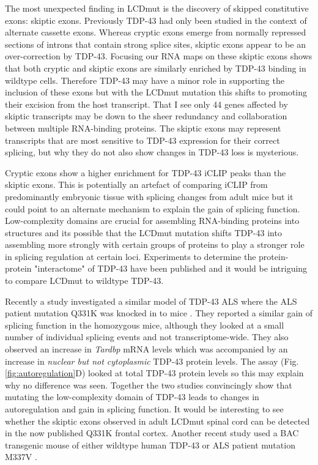 The most unexpected finding in LCDmut is the discovery of skipped constitutive exons: skiptic exons. 
Previously TDP-43 had only been studied in the context of alternate cassette exons.
Whereas cryptic exons emerge from normally repressed sections of introns that contain strong splice sites, skiptic exons appear to be an over-correction by TDP-43.
Focusing our RNA maps on these skiptic exons shows that both cryptic and skiptic exons are similarly enriched by TDP-43 binding in wildtype cells.
Therefore TDP-43 may have a minor role in supporting the inclusion of these exons but with the LCDmut mutation this shifts to promoting their excision from the host transcript.
That I see only 44 genes affected by skiptic transcripts may be down to the sheer redundancy and collaboration between multiple RNA-binding proteins. 
The skiptic exons may represent transcripts that are most sensitive to TDP-43 expression for their correct splicing, but why they do not also show changes in TDP-43 loss is mysterious.

Cryptic exons show a higher enrichment for TDP-43 iCLIP peaks than the skiptic exons. 
This is potentially an artefact of comparing iCLIP from predominantly embryonic tissue with splicing changes from adult mice but it could point to an alternate mechanism to explain the gain of splicing function.
Low-complexity domains are crucial for assembling RNA-binding proteins into structures  \cite{Gueroussov2017} and its possible that the LCDmut mutation shifts TDP-43 into assembling more strongly with certain groups of proteins to play a stronger role in splicing regulation at certain loci. 
Experiments to determine the protein-protein "interactome" of TDP-43 have been published \citep{Freibaum2010-hw} and it would be intriguing to compare LCDmut to wildtype TDP-43. 

Recently a study investigated a similar model of TDP-43 ALS where the ALS patient mutation Q331K was knocked in to mice \citep{White2018}. 
They reported a similar gain of splicing function in the homozygous mice, although they looked at a small number of individual splicing events and not transcriptome-wide.
They also observed an increase in \textit{Tardbp} mRNA levels which was accompanied by an increase in \textit{nuclear but not cytoplasmic} TDP-43 protein levels.
The assay (Fig. \ref{fig:autoregulation}D) looked at total TDP-43 protein levels so this may explain why no difference was seen. 
Together the two studies convincingly show that mutating the low-complexity domain of TDP-43 leads to changes in autoregulation and gain in splicing function.
It would be interesting to see whether the skiptic exons observed in adult LCDmut spinal cord can be detected in the now published Q331K frontal cortex.
Another recent study used a BAC transgenic mouse of either wildtype human TDP-43 or ALS patient mutation M337V \citep{Gordon2018}.
 
